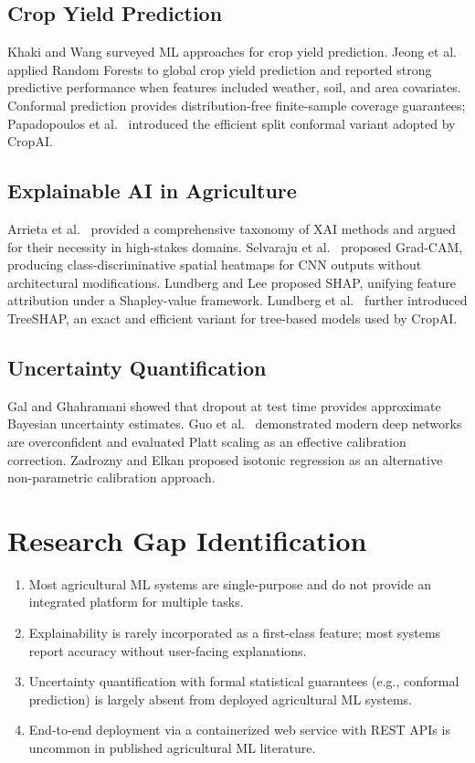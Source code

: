 \documentclass[12pt,a4paper]{report}
\begin{document}
\subsection{Crop Yield Prediction}
Khaki and Wang \cite{khaki2020crop} surveyed ML approaches for crop yield prediction. Jeong et al.\ \cite{jeong2016random} applied Random Forests to global crop yield prediction and reported strong predictive performance when features included weather, soil, and area covariates. Conformal prediction \cite{vovk2005algorithmic, shafer2008tutorial} provides distribution-free finite-sample coverage guarantees; Papadopoulos et al.\ \cite{papadopoulos2002inductive} introduced the efficient split conformal variant adopted by CropAI.

\subsection{Explainable AI in Agriculture}
Arrieta et al.\ \cite{arrieta2020explainable} provided a comprehensive taxonomy of XAI methods and argued for their necessity in high-stakes domains. Selvaraju et al.\ \cite{selvaraju2017grad} proposed Grad-CAM, producing class-discriminative spatial heatmaps for CNN outputs without architectural modifications. Lundberg and Lee \cite{lundberg2017unified} proposed SHAP, unifying feature attribution under a Shapley-value framework. Lundberg et al.\ \cite{lundberg2020local2global} further introduced TreeSHAP, an exact and efficient variant for tree-based models used by CropAI.

\subsection{Uncertainty Quantification}
Gal and Ghahramani \cite{gal2016dropout} showed that dropout at test time provides approximate Bayesian uncertainty estimates. Guo et al.\ \cite{guo2017calibration} demonstrated modern deep networks are overconfident and evaluated Platt scaling \cite{platt1999probabilistic} as an effective calibration correction. Zadrozny and Elkan \cite{zadrozny2002transforming} proposed isotonic regression as an alternative non-parametric calibration approach.

\section{Research Gap Identification}
\begin{enumerate}[leftmargin=*]
  \item Most agricultural ML systems are single-purpose and do not provide an integrated platform for multiple tasks.
  \item Explainability is rarely incorporated as a first-class feature; most systems report accuracy without user-facing explanations.
  \item Uncertainty quantification with formal statistical guarantees (e.g., conformal prediction) is largely absent from deployed agricultural ML systems.
  \item End-to-end deployment via a containerized web service with REST APIs is uncommon in published agricultural ML literature.
\end{enumerate}
\end{document}
